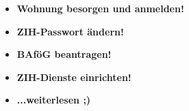 
{
\LARGE
\newcommand{\checkbox}[1]{\item[$\square$]\textbf{#1}\\} %
\begin{itemize}
  \checkbox{Wohnung besorgen und anmelden!}
  \checkbox{ZIH-Passwort ändern!}
  \checkbox{BAföG beantragen!}
  \checkbox{ZIH-Dienste einrichten!}
  \checkbox{...weiterlesen ;)}
\end{itemize}
}
